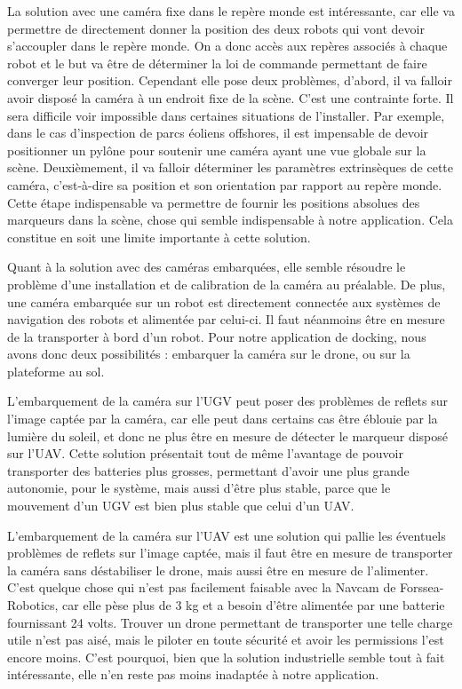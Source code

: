     La solution avec une caméra fixe dans le repère monde est intéressante, car elle va permettre de directement donner la position des deux robots qui vont devoir s’accoupler dans le repère monde. On a donc accès aux repères associés à chaque robot et le but va être de déterminer la loi de commande permettant de faire converger leur position. Cependant elle pose deux problèmes, d’abord, il va falloir avoir disposé la caméra à un endroit fixe de la scène. C’est une contrainte forte. Il sera difficile voir impossible dans certaines situations de l’installer. Par exemple, dans le cas d’inspection de parcs éoliens offshores, il est impensable de devoir positionner un pylône pour soutenir une caméra ayant une vue globale sur la scène. Deuxièmement, il va falloir déterminer les paramètres extrinsèques de cette caméra, c'est-à-dire sa position et son orientation par rapport au repère monde. Cette étape indispensable va permettre de fournir les positions absolues des marqueurs dans la scène, chose qui semble indispensable à notre application. Cela constitue en soit une limite importante à cette solution.
    
    Quant à la solution avec des caméras embarquées, elle semble résoudre le problème d’une installation et de calibration de la caméra au préalable. De plus, une caméra embarquée sur un robot est directement connectée aux systèmes de navigation des robots et alimentée par celui-ci. Il faut néanmoins être en mesure de la transporter à bord d’un robot. Pour notre application de docking, nous avons donc deux possibilités : embarquer la caméra sur le drone, ou sur la plateforme au sol. 

    L’embarquement de la caméra sur l’UGV peut poser des problèmes de reflets sur l’image captée par la caméra, car elle peut dans certains cas être éblouie par la lumière du soleil, et donc ne plus être en mesure de détecter le marqueur disposé sur l’UAV. Cette solution présentait tout de même l’avantage de pouvoir transporter des batteries plus grosses, permettant d’avoir une plus grande autonomie, pour le système, mais aussi d’être plus stable, parce que le mouvement d’un UGV est bien plus stable que celui d’un UAV.

    L’embarquement de la caméra sur l’UAV est une solution qui pallie les éventuels problèmes de reflets sur l’image captée, mais il faut être en mesure de transporter la caméra sans déstabiliser le drone, mais aussi être en mesure de l’alimenter. C’est quelque chose qui n’est pas facilement faisable avec la Navcam de Forssea-Robotics, car elle pèse plus de 3 kg et a besoin d’être alimentée par une batterie fournissant 24 volts. Trouver un drone permettant de transporter une telle charge utile n’est pas aisé, mais le piloter en toute sécurité et avoir les permissions l’est encore moins. C’est pourquoi, bien que la solution industrielle semble tout à fait intéressante, elle n’en reste pas moins inadaptée à notre application.

